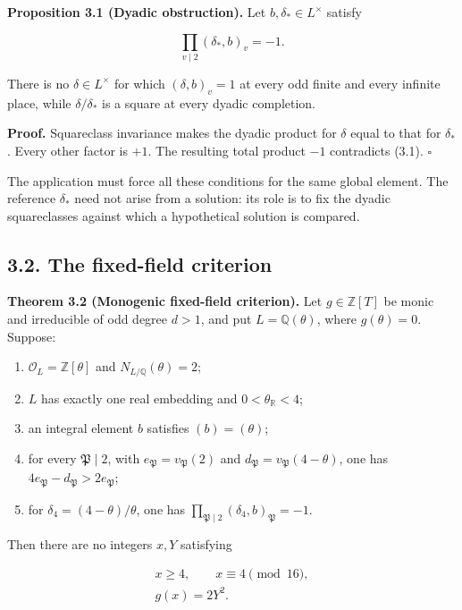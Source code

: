 \documentclass[11pt,a4paper]{article}
\providecommand{\tightlist}{\setlength{\itemsep}{0pt}\setlength{\parskip}{0pt}}
\begin{document}
\protect{}\label{prop-dyadic}
\textbf{Proposition 3.1 (Dyadic obstruction).} Let
\(b,\delta_*\in L^\times\) satisfy

\[
\prod_{v\mid2}(\delta_*,b)_v=-1.
\tag{3.2}
\]

There is no \(\delta\in L^\times\) for which \((\delta,b)_v=1\) at every
odd finite and every infinite place, while \(\delta/\delta_*\) is a
square at every dyadic completion.

\textbf{Proof.} Squareclass invariance makes the dyadic product for
\(\delta\) equal to that for \(\delta_*\). Every other factor is \(+1\).
The resulting total product \(-1\) contradicts (3.1). \(\square\)

The application must force all these conditions for the same global
element. The reference \(\delta_*\) need not arise from a solution: its
role is to fix the dyadic squareclasses against which a hypothetical
solution is compared.

\subsection{3.2. The fixed-field criterion}\label{monogenic-criterion}

\protect{}\label{thm-criterion}
\textbf{Theorem 3.2 (Monogenic fixed-field criterion).} Let
\(g\in\mathbb Z[T]\) be monic and irreducible of odd degree \(d>1\), and
put \(L=\mathbb Q(\theta)\), where \(g(\theta)=0\). Suppose:

\begin{enumerate}
\def\labelenumi{\arabic{enumi}.}
\tightlist
\item
  \(\mathcal O_L=\mathbb Z[\theta]\) and \(N_{L/\mathbb Q}(\theta)=2\);
\item
  \(L\) has exactly one real embedding and \(0<\theta_{\mathbb R}<4\);
\item
  an integral element \(b\) satisfies \((b)=(\theta)\);
\item
  for every \(\mathfrak P\mid2\), with
  \(e_{\mathfrak P}=v_{\mathfrak P}(2)\) and
  \(d_{\mathfrak P}=v_{\mathfrak P}(4-\theta)\), one has
  \(4e_{\mathfrak P}-d_{\mathfrak P}>2e_{\mathfrak P}\);
\item
  for \(\delta_4=(4-\theta)/\theta\), one has
  \(\prod_{\mathfrak P\mid2}(\delta_4,b)_{\mathfrak P}=-1\).
\end{enumerate}

Then there are no integers \(x,Y\) satisfying

\[
\begin{gathered}
x\ge4,\qquad x\equiv4\pmod{16},\\
g(x)=2Y^2.
\end{gathered}
\tag{3.3}
\]
\end{document}

